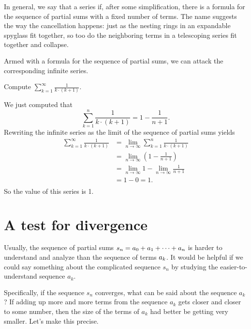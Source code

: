 In general, we say that a series
 if, after some simplification, there is a formula for
the sequence of partial sums with a fixed number of terms.  The name
suggests the way the cancellation happens: just as the nesting rings
in an expandable spyglass fit together, so too do the neighboring
terms in a telescoping series fit together and collapse.

Armed with a formula for the sequence of partial sums, we can attack the corresponding infinite series.

\begin{example}
Compute $\sum_{k=1}^\infty \frac{1}{k \cdot (k+1)}$.
\end{example}
\begin{solution}
We just computed that
$$
\sum_{k=1}^n \frac{1}{k \cdot (k+1)} = 1 - \frac{1}{n+1}.
$$
Rewriting the infinite series as the limit of the sequence of partial sums yields
\begin{align*}
\sum_{k=1}^\infty \frac{1}{k \cdot (k+1)} &= \lim_{n \to \infty} \sum_{k=1}^n \frac{1}{k \cdot (k+1)} \\
&= \lim_{n \to \infty} \left( 1 - \frac{1}{n+1} \right) \\
&= \lim_{n \to \infty} 1 - \lim_{n \to \infty} \frac{1}{n+1} \\
&= 1 - 0 = 1.\\
\end{align*}
So the value of this series is 1.
\end{solution}

\section{A test for divergence}
\label{section:nth-term-test}

Usually, the sequence of partial sums $\displaystyle s_n = a_0 + a_1 + \cdots +
a_n$ is harder to understand and analyze than the sequence of terms
$\displaystyle a_k$.  It would be helpful if we could say something about the
complicated sequence $s_n$ by studying the easier-to-understand
sequence $a_k$.

Specifically, if the sequence $s_n$ converges, what can be said about
the sequence $a_k$?  If adding up more and more terms from the
sequence $a_k$ gets closer and closer to some number, then the size of
the terms of $a_k$ had better be getting very smaller.  Let's make
this precise.

